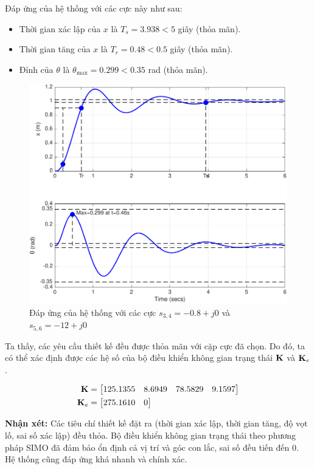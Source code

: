 \documentclass[12pt,a4paper]{article}
\begin{document}
Đáp ứng của hệ thống với các cực này như sau:

\begin{itemize}
    \item Thời gian xác lập của $x$ là $T_s = 3.938 < 5$ giây (thỏa mãn).
    \item Thời gian tăng của $x$ là $T_r = 0.48 < 0.5$ giây (thỏa mãn).
    \item Đỉnh của $\theta$ là $\theta_{\max} = 0.299 < 0.35$ rad (thỏa mãn).
\end{itemize}

\newpage

\begin{figure}[ht]
    \centering
    \includegraphics[width=0.75\linewidth]{ssc.pdf}
    \caption{Đáp ứng của hệ thống với các cực $s_{3,4} = -0.8 +j0$ và $s_{5,6}=-12 + j0$}
\end{figure}

Ta thấy, các yêu cầu thiết kế đều được thỏa mãn với cặp cực đã chọn. Do đó, ta có thể xác định được các hệ số của bộ điều khiển không gian trạng thái $\vb K$ và $\vb K_e$.

\begin{align*}
    \vb K &= \begin{bmatrix}
        125.1355   & 8.6949  &  78.5829  &  9.1597
    \end{bmatrix}\\
    \vb K_e& = \begin{bmatrix}
        275.1610         & 0
    \end{bmatrix}
\end{align*}

\textbf{Nhận xét:} Các tiêu chí thiết kế đặt ra (thời gian xác lập, thời gian tăng, độ vọt lố, sai số xác lập) đều thỏa. Bộ điều khiển không gian trạng thái theo phương pháp SIMO đã đảm bảo ổn định cả vị trí và góc con lắc, sai số đều tiến đến 0. Hệ thống cũng đáp ứng khá nhanh và chính xác.


\newpage


\newpage

\end{document}
